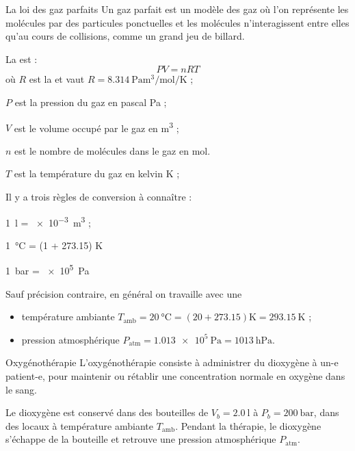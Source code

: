 \begin{doc}{La loi des gaz parfaits}
  Un gaz parfait est un modèle des gaz où l'on représente les molécules par des particules ponctuelles et les molécules n'interagissent entre elles qu'au cours de collisions, comme un grand jeu de billard.
  
  \begin{importants}
    La  est :
    \begin{equation*}
      PV = nRT
    \end{equation*}
    où $R$ est la  et vaut $R = \qty{8,314}{\pascal \m\cubed \per\mole \per\kelvin}$ ;
    \begin{listePoints}
      \item $P$ est la pression du gaz en pascal \unit{\pascal} ;
      \item $V$ est le volume occupé par le gaz en \unit{\m\cubed} ;
      \item $n$ est le nombre de molécules dans le gaz en \unit{\mole}.
      \item $T$ est la température du gaz en kelvin \unit{\kelvin} ;
    \end{listePoints}
  \end{importants}

  Il y a trois règles de conversion à connaître :
  \begin{listePoints}
    \item \qty{1}{\litre} = \qty{e-3}{\m\cubed} ;
    \item \qty{1}{\degreeCelsius} = (1 + \num{273,15}) \unit{\kelvin}
    \item \qty{1}{\bar} = \qty{e5}{\pascal}
  \end{listePoints}

  Sauf précision contraire, en général on travaille avec une
  \begin{itemize}
    \item température ambiante $T_\text{amb} = \qty{20}{\degreeCelsius} 
      = (20 + \num{273,15}) \unit{\kelvin}
      = \qty{293,15}{\kelvin}$ ;
    \item pression atmosphérique $P_\text{atm} = \qty{1,013e5}{\pascal} = \qty{1013}{\hecto\pascal}$.
  \end{itemize}
\end{doc}

\begin{doc}{Oxygénothérapie}
  L'oxygénothérapie consiste à administrer du dioxygène à un-e patient-e, pour maintenir ou rétablir une concentration normale en oxygène dans le sang.

  Le dioxygène est conservé dans des bouteilles de $V_b = \qty{2,0}{\litre}$ à $P_b = \qty{200}{\bar}$, dans des locaux à température ambiante $T_\text{amb}$.
  Pendant la thérapie, le dioxygène s'échappe de la bouteille et retrouve une pression atmosphérique $P_\text{atm}$.
\end{doc}

